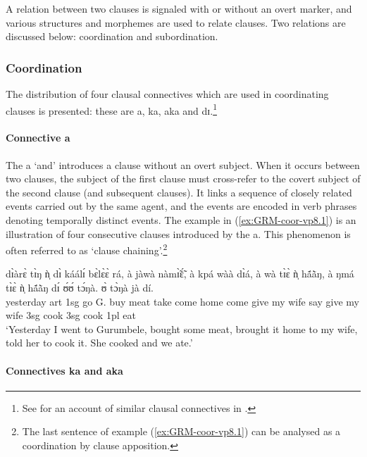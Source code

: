 A relation between two clauses is signaled with or without an overt marker,  and 
various  structures and morphemes  are used to relate clauses.  Two
relations are discussed below: coordination and subordination. 

\subsubsection{Coordination}
\label{GRM-clause-coord}


The distribution of four clausal connectives which are used in coordinating
clauses is presented: these are {\sls a}, {\sls ka}, {\sls aka} and {\sls 
dɪ}.\footnote{See \citet[143--149]{mcgi99} for an account of similar clausal
connectives in .}  


\paragraph{Connective {\sls a}}
\label{GRM-clause-coord-a}


The  {\sls a} `and'  introduces a clause without an overt subject.  When 
it occurs between two clauses, the subject of the first clause must 
cross-refer to the covert subject of the second clause  (and subsequent 
clauses). It links a sequence of closely related events carried out by the same 
agent, and the events are encoded in  verb phrases denoting temporally distinct 
events. The example in (\ref{ex:GRM-coor-vp8.1}) is  an illustration of four 
consecutive clauses introduced by the   {\sls a}.   This phenomenon 
is often referred to as `clause chaining'.\footnote{The last sentence of example (\ref{ex:GRM-coor-vp8.1}) can be analysed as a coordination by clause apposition.}

\ea\label{ex:GRM-coor-vp8.1}
\gll dɪ̀àrɛ̀ tɪ̀ŋ ǹ̩ dɪ̀ káálɪ́ bɛ̀lɛ̀ɛ̀ rá, à {\ob}jàwà nàmɪ̃̀ɛ̃́{\cb}, à 
{\ob}kpá wàà dɪ̀á{\cb}, à  {\ob}wà tɪ̀ɛ̀ ǹ̩ hã́ã̀ŋ{\cb}, à {\ob}ŋmá tɪ̀ɛ̀ ǹ̩ hã́ã̀ŋ{\cb} 
dɪ́ ʊ́ʊ́ tɔ́ŋà. ʊ̀ tɔ̀ŋà jà dí.\\
yesterday {\sc art} {\sc 1sg} {\hest} {go} {G.}  {\foc} {\conn}   buy meat
{\conn}  take come home {\conn}  come give my wife  {\conn}  say give my wife
{\comp}  {\sc 3sg}   {cook} {\sc 3sg}   {cook}  {\sc 1pl} {eat}\\
\glt  `Yesterday I went to Gurumbele,  bought some meat, brought it
home to my wife, told her to cook it. She cooked and we ate.'
\z


\paragraph{Connectives {\sls ka} and {\sls aka}}
\label{GRM-clause-coord-ka-aka}

